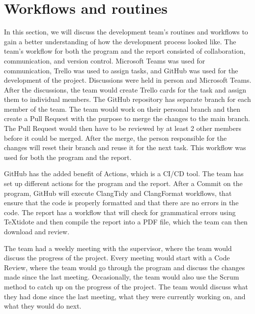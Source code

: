 \section{Workflows and routines}\label{sec:workflows-and-routines}

In this section, we will discuss the development team's routines and workflows to gain a better understanding of how
the development process looked like.
The team's workflow for both the program and the report consisted of collaboration, communication, and version control.
Microsoft Teams was used for communication, Trello was used to assign tasks, and GitHub was used for the development of
the project.
Discussions were held in person and Microsoft Teams.
After the discussions, the team would create Trello cards for the task and assign them to individual members.
The GitHub repository has separate branch for each member of the team.
The team would work on their personal branch and then create a Pull Request with the purpose to merge the changes to the
main branch.
The Pull Request would then have to be reviewed by at least 2 other members before it could be merged.
After the merge, the person responsible for the changes will reset their branch and reuse it for the next task.
This workflow was used for both the program and the report.

GitHub has the added benefit of Actions, which is a CI/CD tool.
The team has set up different actions for the program and the report.
After a Commit on the program, GitHub will execute ClangTidy and ClangFormat workflows, that ensure that the code is
properly formatted and that there are no errors in the code.
The report has a workflow that will check for grammatical errors using TeXtidote and then compile the report into a PDF
file, which the team can then download and review.

The team had a weekly meeting with the supervisor, where the team would discuss the progress of the project.
Every meeting would start with a Code Review, where the team would go through the program and discuss the changes made
since the last meeting.
Occasionally, the team would also use the Scrum method to catch up on the progress of the project.
The team would discuss what they had done since the last meeting, what they were currently working on, and what they
would do next.
